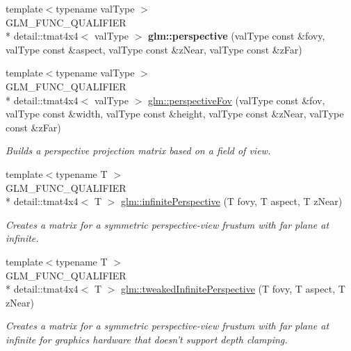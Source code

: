 \begin{DoxyCompactItemize}
\item 
\hypertarget{namespaceglm_ab1ca9ec6ed391988cbf68b450ff8db8e}{{\footnotesize template$<$typename val\-Type $>$ }\\G\-L\-M\-\_\-\-F\-U\-N\-C\-\_\-\-Q\-U\-A\-L\-I\-F\-I\-E\-R \\*
detail\-::tmat4x4$<$ val\-Type $>$ {\bfseries glm\-::perspective} (val\-Type const \&fovy, val\-Type const \&aspect, val\-Type const \&z\-Near, val\-Type const \&z\-Far)}\label{namespaceglm_ab1ca9ec6ed391988cbf68b450ff8db8e}

\item 
{\footnotesize template$<$typename val\-Type $>$ }\\G\-L\-M\-\_\-\-F\-U\-N\-C\-\_\-\-Q\-U\-A\-L\-I\-F\-I\-E\-R \\*
detail\-::tmat4x4$<$ val\-Type $>$ \hyperlink{group__gtc__matrix__transform_gac2bbb4ae38c7cc549feefae5406517d7}{glm\-::perspective\-Fov} (val\-Type const \&fov, val\-Type const \&width, val\-Type const \&height, val\-Type const \&z\-Near, val\-Type const \&z\-Far)
\begin{DoxyCompactList}\small\item\em Builds a perspective projection matrix based on a field of view. \end{DoxyCompactList}\item 
{\footnotesize template$<$typename T $>$ }\\G\-L\-M\-\_\-\-F\-U\-N\-C\-\_\-\-Q\-U\-A\-L\-I\-F\-I\-E\-R \\*
detail\-::tmat4x4$<$ T $>$ \hyperlink{group__gtc__matrix__transform_ga414f3cfe1af5619acebd5c28cf6bd45c}{glm\-::infinite\-Perspective} (T fovy, T aspect, T z\-Near)
\begin{DoxyCompactList}\small\item\em Creates a matrix for a symmetric perspective-\/view frustum with far plane at infinite. \end{DoxyCompactList}\item 
{\footnotesize template$<$typename T $>$ }\\G\-L\-M\-\_\-\-F\-U\-N\-C\-\_\-\-Q\-U\-A\-L\-I\-F\-I\-E\-R \\*
detail\-::tmat4x4$<$ T $>$ \hyperlink{group__gtc__matrix__transform_ga42299b3ef778f1d6120032da73b0ef87}{glm\-::tweaked\-Infinite\-Perspective} (T fovy, T aspect, T z\-Near)
\begin{DoxyCompactList}\small\item\em Creates a matrix for a symmetric perspective-\/view frustum with far plane at infinite for graphics hardware that doesn't support depth clamping. \end{DoxyCompactList}\item 

\end{DoxyCompactItemize}
